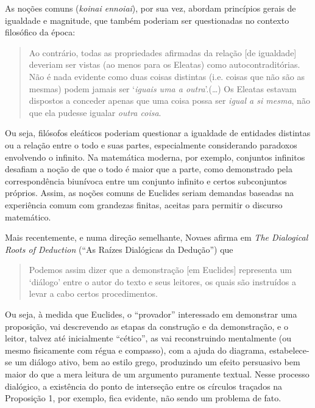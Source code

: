 \documentclass{hipatia}
\begin{document}
As noções comuns (\emph{koinai ennoiai}), por sua vez, abordam
princípios gerais de igualdade e magnitude, que 
também poderiam ser 
questionadas no contexto filosófico da
época: 
\begin{quote}
	Ao contrário, todas as propriedades afirmadas 
	da relação [de igualdade] deveriam ser vistas
	(ao menos para os Eleatas) como autocontraditórias.
	Não é nada evidente como duas coisas distintas
	(i.e. coisas que não são as mesmas) podem
	jamais ser `\emph{iguais uma a outra}'.(\dots)
	Os Eleatas estavam dispostos a conceder apenas 
	que uma coisa possa ser \emph{igual a si mesma},
	não que ela pudesse igualar \emph{outra coisa}.
	\cite{szabo1978}
\end{quote}
Ou seja, filósofos eleáticos poderiam questionar a igualdade de
entidades distintas ou a relação entre o todo e suas partes,
especialmente considerando paradoxos envolvendo o infinito.
Na matemática moderna, por exemplo, conjuntos infinitos
desafiam a noção de que o todo é maior que a parte, como
demonstrado pela correspondência biunívoca entre um conjunto
infinito e certos subconjuntos próprios. Assim, as noções
comuns de Euclides seriam demandas baseadas na
experiência comum com grandezas finitas, aceitas para
permitir o discurso matemático.

Mais recentemente, e numa direção semelhante, 
Novaes afirma em \emph{The Dialogical Roots of Deduction}
(``As Raízes Dialógicas da Dedução'') \cite{Novaes2020}
que
\begin{quote}
	Podemos assim dizer que a demonstração [em Euclides] representa
	um `diálogo' entre o autor do texto e seus leitores, os 
	quais são instruídos a levar a cabo certos procedimentos.
\end{quote}
Ou seja, à medida que Euclides, o ``provador''
interessado em demonstrar uma proposição, vai descrevendo as
etapas da construção e da demonstração, e o leitor,
talvez até inicialmente ``cético'', 
as vai reconstruindo mentalmente (ou mesmo fisicamente
com régua e compasso), com a ajuda do diagrama,
estabelece-se um diálogo ativo,
bem ao estilo grego, produzindo um efeito persuasivo bem maior
do que a mera leitura de um argumento puramente textual. 
Nesse processo dialógico, a existência do 
ponto de interseção entre os círculos traçados
na Proposição 1, por exemplo, fica evidente,
não sendo um problema de fato. 
\end{document}
